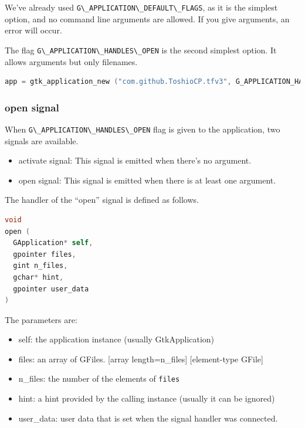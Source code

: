 We've already used
\passthrough{\lstinline!G\_APPLICATION\_DEFAULT\_FLAGS!}, as it is the
simplest option, and no command line arguments are allowed. If you give
arguments, an error will occur.

The flag \passthrough{\lstinline!G\_APPLICATION\_HANDLES\_OPEN!} is the
second simplest option. It allows arguments but only filenames.

\begin{lstlisting}[language=C]
app = gtk_application_new ("com.github.ToshioCP.tfv3", G_APPLICATION_HANDLES_OPEN);
\end{lstlisting}

\subsubsection{open signal}\label{open-signal-1}

When \passthrough{\lstinline!G\_APPLICATION\_HANDLES\_OPEN!} flag is
given to the application, two signals are available.

\begin{itemize}
\tightlist
\item
  activate signal: This signal is emitted when there's no argument.
\item
  open signal: This signal is emitted when there is at least one
  argument.
\end{itemize}

The handler of the ``open'' signal is defined as follows.

\begin{lstlisting}[language=C]
void
open (
  GApplication* self,
  gpointer files,
  gint n_files,
  gchar* hint,
  gpointer user_data
)
\end{lstlisting}

The parameters are:

\begin{itemize}
\tightlist
\item
  self: the application instance (usually GtkApplication)
\item
  files: an array of GFiles. {[}array length=n\_files{]} {[}element-type
  GFile{]}
\item
  n\_files: the number of the elements of
  \passthrough{\lstinline!files!}
\item
  hint: a hint provided by the calling instance (usually it can be
  ignored)
\item
  user\_data: user data that is set when the signal handler was
  connected.
\end{itemize}

